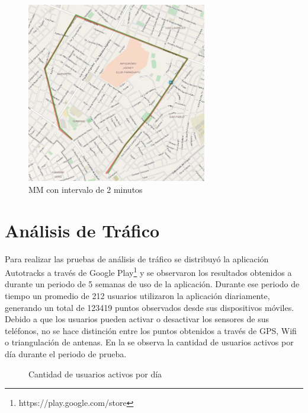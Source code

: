 \begin{figure}[!htb]
	\centering
	\includegraphics[width=0.7\textwidth]{capitulos/7/figuras/figura3.jpg}
	\caption{\label{fig:mm_2m} MM con intervalo de 2 minutos}	
\end{figure}

\section{Análisis de Tráfico}

Para realizar las pruebas de análisis de tráfico se distribuyó la aplicación Autotracks a través de Google Play\footnote{https://play.google.com/store} y se observaron los resultados obtenidos a durante un periodo de 5 semanas de uso de la aplicación. Durante ese periodo de tiempo un promedio de 212 usuarios utilizaron la aplicación diariamente, generando un total de 123419 puntos observados desde sus dispositivos móviles. Debido a que los usuarios pueden activar o desactivar los sensores de sus teléfonos, no se hace distinción entre los puntos obtenidos a través de GPS, Wifi o triangulación de antenas. En la  se observa la cantidad de usuarios activos por día durante el periodo de prueba.

\begin{figure}[h]
	\centering
	\caption{Cantidad de usuarios activos por día}
	\label{fig:cantidad_usuarios}
\end{figure}

